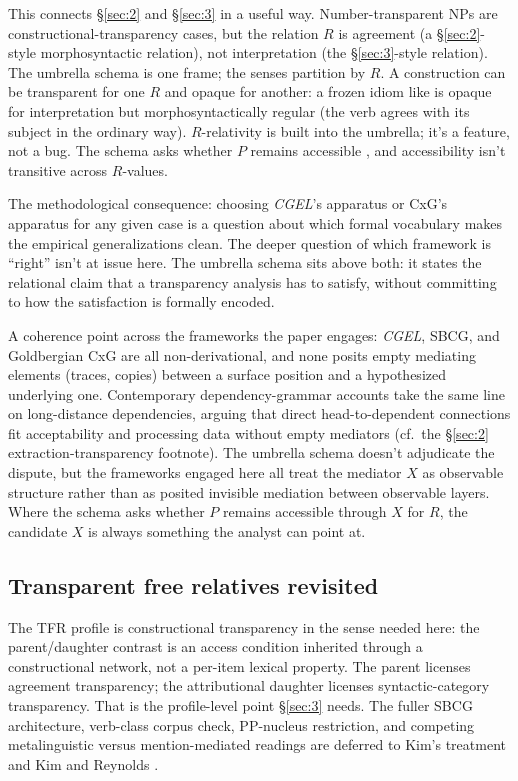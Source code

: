 This connects §\ref{sec:2} and §\ref{sec:3} in a useful way. Number-transparent NPs are constructional-transparency cases, but the relation $R$ is agreement (a §\ref{sec:2}-style morphosyntactic relation), not interpretation (the §\ref{sec:3}-style relation). The umbrella schema is one frame; the senses partition by $R$. A construction can be transparent for one $R$ and opaque for another: a frozen idiom like  is opaque for interpretation but morphosyntactically regular (the verb agrees with its subject in the ordinary way). $R$-relativity is built into the umbrella; it's a feature, not a bug. The schema asks whether $P$ remains accessible , and accessibility isn't transitive across $R$-values.

The methodological consequence: choosing \textit{CGEL}'s apparatus or CxG's apparatus for any given case is a question about which formal vocabulary makes the empirical generalizations clean. The deeper question of which framework is \enquote{right} isn't at issue here. The umbrella schema sits above both: it states the relational claim that a transparency analysis has to satisfy, without committing to how the satisfaction is formally encoded.

A coherence point across the frameworks the paper engages: \textit{CGEL}, SBCG, and Goldbergian CxG are all non-derivational, and none posits empty mediating elements (traces, copies) between a surface position and a hypothesized underlying one. Contemporary dependency-grammar accounts \autocite{gibson2025,dacunha-gibson-2025-syntactic-complexity} take the same line on long-distance dependencies, arguing that direct head-to-dependent connections fit acceptability and processing data without empty mediators (cf.~the §\ref{sec:2} extraction-transparency footnote). The umbrella schema doesn't adjudicate the dispute, but the frameworks engaged here all treat the mediator $X$ as observable structure rather than as posited invisible mediation between observable layers. Where the schema asks whether $P$ remains accessible through $X$ for $R$, the candidate $X$ is always something the analyst can point at.

\subsection{Transparent free relatives revisited}\label{sec:3-5}

The TFR profile is constructional transparency in the sense needed here: the parent/daughter contrast is an access condition inherited through a constructional network, not a per-item lexical property. The parent licenses agreement transparency; the attributional daughter licenses syntactic-category transparency. That is the profile-level point §\ref{sec:3} needs. The fuller SBCG architecture, verb-class corpus check, PP-nucleus restriction, and competing metalinguistic versus mention-mediated readings are deferred to Kim's \autocite*[ch.~6.8]{kim-2026-form-function} treatment and Kim and Reynolds \autocite*{kim-reynolds-2026-tfr-two-kinds}.

